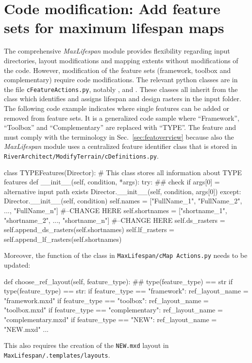 \section{Code modification: Add feature sets for maximum lifespan maps} \label{sec:actcode}
The comprehensive \textit{MaxLifespan} module provides flexibility regarding input directories, layout modifications and mapping extents without modifications of the code. However, modification of the feature sets (framework, toolbox and complementary) require code modifications. The relevant python classes are in the file \texttt{cFeatureActions.py}, notably ,  and . These classes all inherit from the  class which identifies and assigns lifespan and design rasters in the input folder. The following code example indicates where single features can be added or removed from feature sets. It is a generalized code sample where ``Framework'', ``Toolbox'' and ``Complementary'' are replaced with ``TYPE''. The feature  and  must comply with the terminology in Sec.~\ref{sec:featoverview} because also the \textit{MaxLifespan} module uses a centralized feature identifier class that is stored in \texttt{RiverArchitect/ModifyTerrain/cDefinitions.py}.\\

\begin{python}
class TYPEFeatures(Director):
    # This class stores all information about TYPE features
    def __init__(self, condition, *args):
        try:
            ## check if args[0] = alternative input path exists
            Director.__init__(self, condition, args[0])
        except:
            Director.__init__(self, condition)
        self.names = ["FullName_1", "FullName_2", ..., "FullName_n"] #--CHANGE HERE
        self.shortnames = ["shortname_1", "shortname_2", ..., "shortname_n"] #--CHANGE HERE
        self.ds_rasters = self.append_ds_rasters(self.shortnames)
        self.lf_rasters = self.append_lf_rasters(self.shortnames)
\end{python}

Moreover, the  function of the  class in \texttt{MaxLifespan/cMap Actions.py} needs to be updated:
\begin{python}
  def choose_ref_layout(self, feature_type):
    ## type(feature_type) == str
    if type(feature_type) == str:
      if feature_type == "framework":
        ref_layout_name = "framework.mxd"
      if feature_type == "toolbox":
        ref_layout_name = "toolbox.mxd"
      if feature_type == "complementary":
        ref_layout_name = "complementary.mxd"
      if feature_type == "NEW":
        ref_layout_name = "NEW.mxd"
    ...
\end{python}

This also requires the creation of the \texttt{NEW.mxd} layout in \texttt{MaxLifespan/.templates/layouts}.
